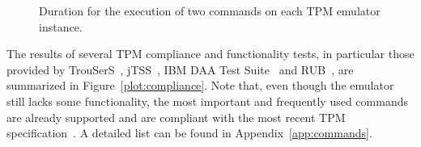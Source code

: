 \documentclass[runningheads]{llncs}
\begin{document}
\begin{figure}
	\begin{center}
		\quad%
		\vspace*{-3mm}
		\caption{Duration for the execution of two commands on each TPM emulator
			instance.}
		\label{plot:execution_time}
	\end{center}
\end{figure}

The results of several TPM compliance and functionality tests, in particular
those provided by TrouSerS~\cite{trousers}, jTSS~\cite{jTSS}, IBM DAA Test
Suite~\cite{ibmdaatest} and RUB~\cite{Sadeghi}, are summarized in
Figure~\ref{plot:compliance}.
Note that, even though the emulator still lacks some functionality,
the most important and frequently used commands are already supported and
are compliant with the most recent TPM specification~\cite{TPM}.
A detailed list can be found in Appendix~\ref{app:commands}.
\end{document}
